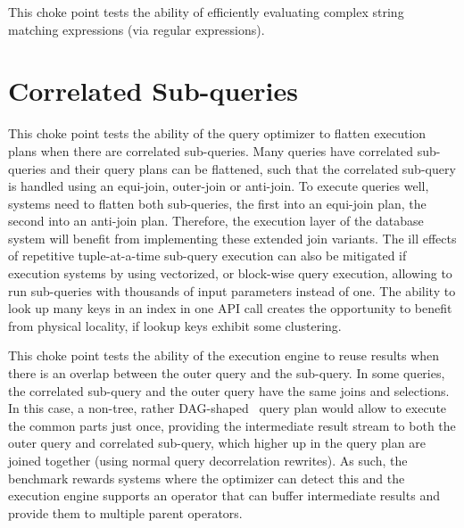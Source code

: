 
This choke point tests the ability of efficiently evaluating complex string
matching expressions (\eg via regular expressions).

%


\section{Correlated Sub-queries}



This choke point tests the ability of the query optimizer to flatten execution plans when there are correlated sub-queries. Many queries have correlated sub-queries and their query plans can be flattened,
such that the correlated sub-query is handled using an equi-join, outer-join or anti-join. To execute queries well, systems need to flatten both sub-queries, the first into an equi-join plan, the second into an anti-join plan.
Therefore, the execution layer of the database system will benefit from implementing these extended join variants.
The ill effects of repetitive tuple-at-a-time sub-query execution can also be mitigated if execution systems by using vectorized, or block-wise query execution, allowing to run sub-queries with thousands of input parameters instead of one.
The ability to look up many keys in an index in one API call creates the opportunity to benefit from physical locality, if lookup keys exhibit some clustering.





This choke point tests the ability of the execution engine to reuse results when there is an overlap between the outer query and the sub-query. In some queries, the correlated sub-query and the outer query have the same joins and selections.
In this case, a non-tree, rather DAG-shaped~\cite{DBLP:conf/btw/NeumannM09} query plan would allow to execute the common parts just once, providing the intermediate result stream to both the outer query and correlated sub-query,
which higher up in the query plan are joined together (using normal query decorrelation rewrites).
As such, the benchmark rewards systems where the optimizer can detect this and the execution engine supports an operator that can buffer intermediate results and provide them to multiple parent operators.

